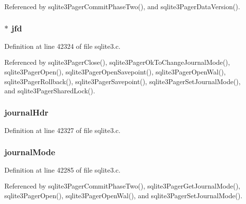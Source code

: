 Referenced by sqlite3\+Pager\+Commit\+Phase\+Two(), and sqlite3\+Pager\+Data\+Version().

\hypertarget{struct_pager_a6cf3b74eb6e96a0ec1018a1829fa5a40}{}
\subsubsection[{jfd}]{$\ast$ jfd}\label{struct_pager_a6cf3b74eb6e96a0ec1018a1829fa5a40}


Definition at line 42324 of file sqlite3.\+c.



Referenced by sqlite3\+Pager\+Close(), sqlite3\+Pager\+Ok\+To\+Change\+Journal\+Mode(), sqlite3\+Pager\+Open(), sqlite3\+Pager\+Open\+Savepoint(), sqlite3\+Pager\+Open\+Wal(), sqlite3\+Pager\+Rollback(), sqlite3\+Pager\+Savepoint(), sqlite3\+Pager\+Set\+Journal\+Mode(), and sqlite3\+Pager\+Shared\+Lock().

\hypertarget{struct_pager_af083145c1d130d6c6dc3ed0eaf3683ef}{}
\subsubsection[{journal\+Hdr}]{ journal\+Hdr}\label{struct_pager_af083145c1d130d6c6dc3ed0eaf3683ef}


Definition at line 42327 of file sqlite3.\+c.

\hypertarget{struct_pager_a0554b570563ec30be50c2c5901bba799}{}
\subsubsection[{journal\+Mode}]{ journal\+Mode}\label{struct_pager_a0554b570563ec30be50c2c5901bba799}


Definition at line 42285 of file sqlite3.\+c.



Referenced by sqlite3\+Pager\+Commit\+Phase\+Two(), sqlite3\+Pager\+Get\+Journal\+Mode(), sqlite3\+Pager\+Open(), sqlite3\+Pager\+Open\+Wal(), and sqlite3\+Pager\+Set\+Journal\+Mode().

\hypertarget{struct_pager_af4f5415276d71ec77ce45bb650e04d58}{}
